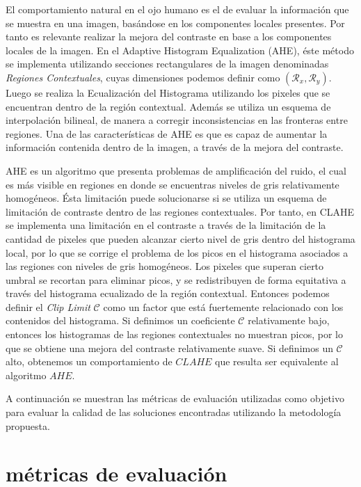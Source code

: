 \documentclass[spanish]{article}
\begin{document}
El comportamiento natural en el ojo humano es el de evaluar la información que se muestra en una imagen, basándose en los componentes locales presentes. Por tanto es relevante realizar la mejora del contraste en base a los componentes locales de la imagen. En el Adaptive Histogram Equalization (AHE), éste método se implementa utilizando secciones rectangulares de la imagen denominadas {\it Regiones Contextuales}, cuyas dimensiones podemos definir como $(\mathcal{R}_x, \mathcal{R}_y)$. Luego se realiza la Ecualización del Histograma utilizando los pixeles que se encuentran dentro de la región contextual. Además se utiliza un esquema de interpolación bilineal, de manera a corregir inconsistencias en las fronteras entre regiones. Una de las características de AHE es que es capaz de aumentar la información contenida dentro de la imagen, a través de la mejora del contraste\cite{zimmerman1988evaluation}.

AHE es un algoritmo que presenta problemas de amplificación del ruido, el cual es más visible en regiones en donde se encuentras niveles de gris relativamente homogéneos. Ésta limitación puede solucionarse si se utiliza un esquema de limitación de contraste dentro de las regiones contextuales. Por tanto, en CLAHE se implementa una limitación en el contraste a través de la limitación de la cantidad de pixeles que pueden alcanzar cierto nivel de gris dentro del histograma local, por lo que se corrige el problema de los picos en el histograma asociados a las regiones con niveles de gris homogéneos. Los pixeles que superan cierto umbral se recortan para eliminar picos, y se redistribuyen de forma equitativa a través del histograma ecualizado de la región contextual. Entonces podemos definir el {\it Clip Limit} $\mathcal{C}$ como un factor que está fuertemente relacionado con los contenidos del histograma. Si definimos un coeficiente $\mathcal{C}$ relativamente bajo, entonces los histogramas de las regiones contextuales no muestran picos, por lo que se obtiene una mejora del contraste relativamente suave. Si definimos un $\mathcal{C}$ alto, obtenemos un comportamiento de $CLAHE$ que resulta ser equivalente al algoritmo $AHE$.

A continuación se muestran las métricas de evaluación utilizadas como objetivo para evaluar la calidad de las soluciones encontradas utilizando la metodología propuesta.

\section{métricas de evaluación}
\label{sec:metricas}
\end{document}
